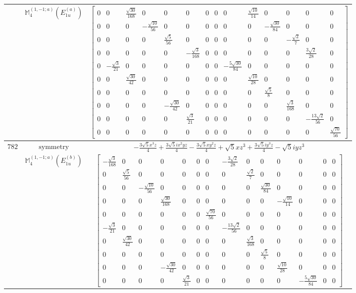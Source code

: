 \documentclass[fleqn,8pt,landscape]{jsarticle}
\begin{document}
\begin{longtable}{ccc}
$  $ & $ \mathbb{M}_{4}^{(1,-1;a)}(E_{1u}^{(a)}) $ & $ \begin{bmatrix} 0 & 0 & \frac{\sqrt{30}}{168} & 0 & 0 & 0 & 0 & 0 & 0 & \frac{\sqrt{10}}{14} & 0 & 0 & 0 & 0 \\ 0 & 0 & 0 & - \frac{\sqrt{10}}{56} & 0 & 0 & 0 & 0 & 0 & 0 & - \frac{\sqrt{30}}{84} & 0 & 0 & 0 \\ 0 & 0 & 0 & 0 & \frac{\sqrt{5}}{56} & 0 & 0 & 0 & 0 & 0 & 0 & - \frac{\sqrt{2}}{7} & 0 & 0 \\ 0 & 0 & 0 & 0 & 0 & - \frac{\sqrt{3}}{168} & 0 & 0 & 0 & 0 & 0 & 0 & \frac{3 \sqrt{2}}{28} & 0 \\ 0 & - \frac{\sqrt{3}}{21} & 0 & 0 & 0 & 0 & 0 & 0 & - \frac{5 \sqrt{30}}{84} & 0 & 0 & 0 & 0 & 0 \\ 0 & 0 & \frac{\sqrt{30}}{42} & 0 & 0 & 0 & 0 & 0 & 0 & \frac{\sqrt{10}}{28} & 0 & 0 & 0 & 0 \\ 0 & 0 & 0 & 0 & 0 & 0 & 0 & 0 & 0 & 0 & \frac{\sqrt{5}}{8} & 0 & 0 & 0 \\ 0 & 0 & 0 & 0 & - \frac{\sqrt{30}}{42} & 0 & 0 & 0 & 0 & 0 & 0 & \frac{\sqrt{3}}{168} & 0 & 0 \\ 0 & 0 & 0 & 0 & 0 & \frac{\sqrt{3}}{21} & 0 & 0 & 0 & 0 & 0 & 0 & - \frac{13 \sqrt{2}}{56} & 0 \\ 0 & 0 & 0 & 0 & 0 & 0 & 0 & 0 & 0 & 0 & 0 & 0 & 0 & \frac{\sqrt{70}}{56} \end{bmatrix} $ \\ \hline
$ 782 $ & $ \text{symmetry} $ & $ - \frac{3 \sqrt{5} x^{3} z}{4} + \frac{3 \sqrt{5} i x^{2} y z}{4} - \frac{3 \sqrt{5} x y^{2} z}{4} + \sqrt{5} x z^{3} + \frac{3 \sqrt{5} i y^{3} z}{4} - \sqrt{5} i y z^{3} $ \\
$  $ & $ \mathbb{M}_{4}^{(1,-1;a)}(E_{1u}^{(b)}) $ & $ \begin{bmatrix} - \frac{\sqrt{3}}{168} & 0 & 0 & 0 & 0 & 0 & 0 & - \frac{3 \sqrt{2}}{28} & 0 & 0 & 0 & 0 & 0 & 0 \\ 0 & \frac{\sqrt{5}}{56} & 0 & 0 & 0 & 0 & 0 & 0 & \frac{\sqrt{2}}{7} & 0 & 0 & 0 & 0 & 0 \\ 0 & 0 & - \frac{\sqrt{10}}{56} & 0 & 0 & 0 & 0 & 0 & 0 & \frac{\sqrt{30}}{84} & 0 & 0 & 0 & 0 \\ 0 & 0 & 0 & \frac{\sqrt{30}}{168} & 0 & 0 & 0 & 0 & 0 & 0 & - \frac{\sqrt{10}}{14} & 0 & 0 & 0 \\ 0 & 0 & 0 & 0 & 0 & 0 & \frac{\sqrt{70}}{56} & 0 & 0 & 0 & 0 & 0 & 0 & 0 \\ - \frac{\sqrt{3}}{21} & 0 & 0 & 0 & 0 & 0 & 0 & - \frac{13 \sqrt{2}}{56} & 0 & 0 & 0 & 0 & 0 & 0 \\ 0 & \frac{\sqrt{30}}{42} & 0 & 0 & 0 & 0 & 0 & 0 & \frac{\sqrt{3}}{168} & 0 & 0 & 0 & 0 & 0 \\ 0 & 0 & 0 & 0 & 0 & 0 & 0 & 0 & 0 & \frac{\sqrt{5}}{8} & 0 & 0 & 0 & 0 \\ 0 & 0 & 0 & - \frac{\sqrt{30}}{42} & 0 & 0 & 0 & 0 & 0 & 0 & \frac{\sqrt{10}}{28} & 0 & 0 & 0 \\ 0 & 0 & 0 & 0 & \frac{\sqrt{3}}{21} & 0 & 0 & 0 & 0 & 0 & 0 & - \frac{5 \sqrt{30}}{84} & 0 & 0 \end{bmatrix} $ \\ \hline

\end{longtable}
\end{document}
